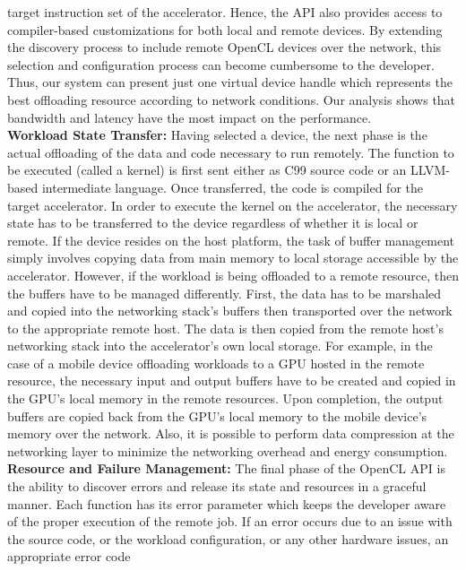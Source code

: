 \documentclass[conference]{IEEEtran}
\begin{document}
target instruction set of the accelerator.
%
Hence, the API also provides access to compiler-based customizations for
both local and remote devices.
%
By extending the discovery process to include remote OpenCL devices over
the network, this selection and configuration process can become
cumbersome to the developer.
%
Thus, our system can present just one virtual device handle which
represents the best offloading resource according to network conditions.
%
Our analysis shows that bandwidth and latency have the most impact on
the performance.\\
%
\textbf{Workload State Transfer:} Having selected a device, the next
phase is the actual offloading of the data and code necessary to run
remotely.
%
The function to be executed (called a kernel) is first sent either as
C99 source code or an LLVM-based intermediate language.
%
Once transferred, the code is compiled for the target accelerator.
%
In order to execute the kernel on the accelerator, the necessary state
has to be transferred to the device regardless of whether it is local or
remote.
%
If the device resides on the host platform, the task of buffer management
simply involves copying data from main memory to local storage
accessible by the accelerator.
%
However, if the workload is being offloaded to a remote resource, then
the buffers have to be managed differently.
%
First, the data has to be marshaled and copied into the networking
stack's buffers then transported over the network to the appropriate
remote host.
%
The data is then copied from the remote host's networking stack into the
accelerator's own local storage.
%
For example, in the case of a mobile device offloading workloads to a
GPU hosted in the remote resource, the necessary input and output
buffers have to be created and copied in the GPU's local memory in the
remote resources.
%
Upon completion, the output buffers are copied back from the GPU's local
memory to the mobile device's memory over the network.
%
Also, it is possible to perform data compression at the networking layer
to minimize the networking overhead and energy consumption.\\
%
\textbf{Resource and Failure Management:} The final phase of the OpenCL
API is the ability to discover errors and release its state and
resources in a graceful manner.
%
Each function has its error parameter which keeps the developer aware of
the proper execution of the remote job.
%
If an error occurs due to an issue with the source code, or the workload
configuration, or any other hardware issues, an appropriate error code
\end{document}
